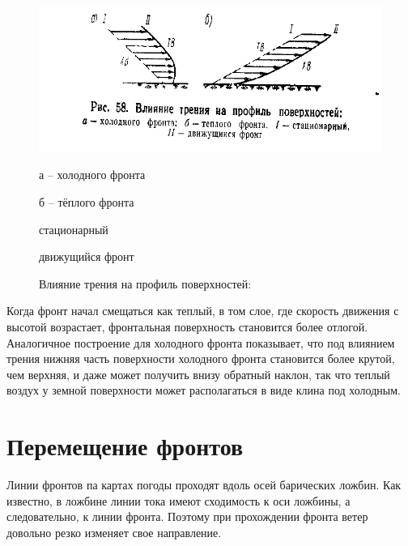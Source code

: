 \documentclass[a4paper, 12pt, twoside, final, book, russian, fittopage, cyremdash, openright]{ncc}
\begin{document}
\begin{figure}[htb]
   \centering
   \includegraphics[scale=1]{12_friction_surface_profile.pdf}
   \caption[Влияние трения на профиль поверхностей]{Влияние трения на профиль поверхностей:}
   \label{fig:firction_sufrace_profile}
   \small
   \begin{enumerate*}[itemjoin={{; }}, label={}, after={{; }}]
   \item а \--- холодного фронта
   \item б \--- тёплого фронта
   \end{enumerate*}
   \begin{enumerate*}[itemjoin={{; }}, label={\Roman* \--- }]
   \item стационарный
   \item движущийся фронт
   \end{enumerate*}
\end{figure}

Когда фронт начал смещаться как теплый, в том слое, где скорость
движения с высотой возрастает, фронтальная поверхность становится
более отлогой. Аналогичное построение для холодного фронта показывает,
что под влиянием трения нижняя часть поверхности холодного фронта
становится более крутой, чем верхняя, и даже может получить внизу
обратный наклон, так что теплый воздух у земной поверхности может
располагаться в виде клина под холодным.

\section{Перемещение фронтов}
\label{sec:fronts_moving}

Линии фронтов па картах погоды проходят вдоль осей барических
ложбин. Как известно, в ложбине линии тока имеют сходимость к оси
ложбины, а следовательно, к линии фронта. Поэтому при прохождении
фронта ветер довольно резко изменяет свое направление.
\end{document}
